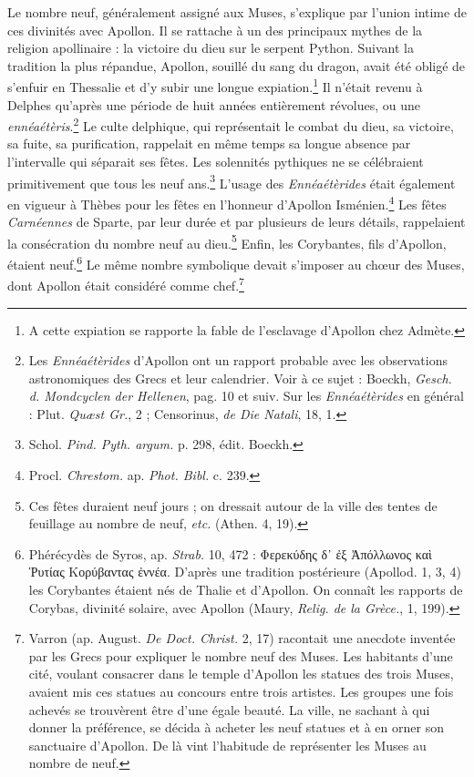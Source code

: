 \documentclass[a4paper, 11pt, oneside, polutonikogreek, french]{article}
\begin{document}
Le nombre neuf, généralement assigné aux Muses, s'explique par l'union intime de ces divinités avec Apollon. Il se rattache à un des principaux mythes de la religion apollinaire : la victoire du dieu sur le serpent Python. Suivant la tradition la plus répandue, Apollon, souillé du sang du dragon, avait été obligé de s'enfuir en Thessalie et d'y subir une longue expiation.\footnote{A cette expiation se rapporte la fable de l'esclavage d'Apollon chez Admète.} Il n'était revenu à Delphes qu'après une période de huit années entièrement révolues, ou une \emph{ennéaétèris}.\footnote{Les \emph{Ennéaétèrides} d'Apollon ont un rapport probable avec les observations astronomiques des Grecs et leur calendrier. Voir à ce sujet : Boeckh, \emph{Gesch. d. Mondcyclen der Hellenen}, pag. 10 et suiv. Sur les \emph{Ennéaétèrides} en général : Plut. \emph{Quæst Gr.}, 2 ; Censorinus, \emph{de Die Natali}, 18, 1.} Le culte delphique, qui représentait le combat du dieu, sa victoire, sa fuite, sa purification, rappelait en même temps sa longue absence par l'intervalle qui séparait ses fêtes. Les solennités pythiques ne se célébraient primitivement que tous les neuf ans.\footnote{Schol. \emph{Pind. Pyth. argum.} p. 298, édit. Boeckh.} L'usage des \emph{Ennéaétèrides} était également en vigueur à Thèbes pour les fêtes en l'honneur d'Apollon Isménien.\footnote{Procl. \emph{Chrestom.} ap. \emph{Phot. Bibl.} c. 239.} Les fêtes \emph{Carnéennes} de Sparte, par leur durée et par plusieurs de leurs détails, rappelaient la consécration du nombre neuf au dieu.\footnote{Ces fêtes duraient neuf jours ; on dressait autour de la ville des tentes de feuillage au nombre de neuf, \emph{etc.} (Athen. 4, 19).} Enfin, les Corybantes, fils d'Apollon, étaient neuf.\footnote{Phérécydès de Syros, ap. \emph{Strab.} 10, 472 : Φερεκύδης δ᾽ ἐξ Ἀπόλλωνος καὶ Ῥυτίας Κορύβαντας ἐννέα. D'après une tradition postérieure (Apollod. 1, 3, 4) les Corybantes étaient nés de Thalie et d'Apollon. On connaît les rapports de Corybas, divinité solaire, avec Apollon (Maury, \emph{Relig. de la Grèce.}, 1, 199).} Le même nombre symbolique devait s'imposer au chœur des Muses, dont Apollon était considéré comme chef.\footnote{Varron (ap. August. \emph{De Doct. Christ.} 2, 17) racontait une anecdote inventée par les Grecs pour expliquer le nombre neuf des Muses. Les habitants d'une cité, voulant consacrer dans le temple d'Apollon les statues des trois Muses, avaient mis ces statues au concours entre trois artistes. Les groupes une fois achevés se trouvèrent être d'une égale beauté. La ville, ne sachant à qui donner la préférence, se décida à acheter les neuf statues et à en orner son sanctuaire d'Apollon. De là vint l'habitude de représenter les Muses au nombre de neuf.}
\end{document}
